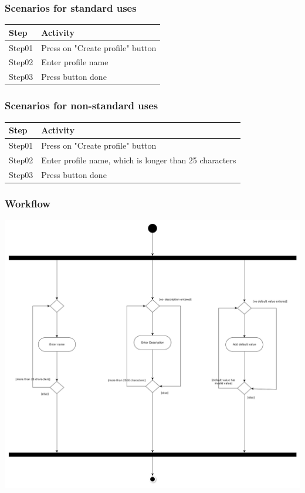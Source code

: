 \documentclass[12pt]{scrartcl}
\begin{document}
    \subsubsection{Scenarios for standard uses}
        \begin{tabular}{|l|l|}
            \hline
            Step & Activity \\ \hline
            Step01 & Press on "Create profile" button\\ \hline
            Step02 & Enter profile name \\ \hline
            Step03 & Press button done \\ \hline
        \end{tabular}
    \subsubsection{Scenarios for non-standard uses}
        \begin{tabular}{|l|l|}
            \hline
            Step & Activity \\ \hline
            Step01 & Press on "Create profile" button\\ \hline
            Step02 & Enter profile name, which is longer than 25 characters\\ \hline
            Step03 & Press button done \\ \hline
        \end{tabular}
    \subsubsection{Workflow}
        \includegraphics[scale=.4]{Materials/Images/manage_profile_workflow.png}
\end{document}
